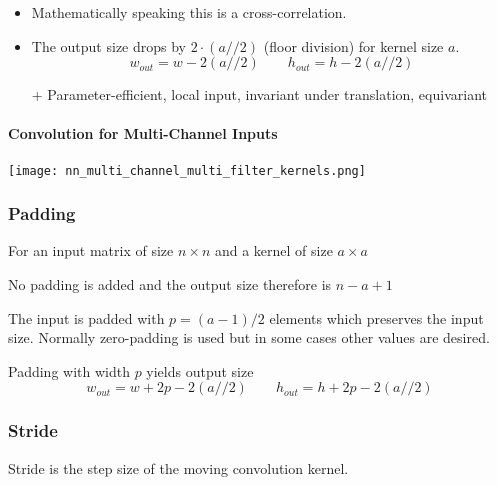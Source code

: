 \newpar{}
\begin{itemize}
    \item Mathematically speaking this is a cross-correlation.
    \item The output size drops by $2\cdot (a//2)$ (floor division) for kernel size $a$.
          \begin{equation*}
              w_{out}=  w-2(a//2) \qquad
              h_{out}=  h-2(a//2)
          \end{equation*}
    \item [+] Parameter-efficient, local input, invariant under translation, equivariant
\end{itemize}

\paragraph{Convolution for Multi-Channel Inputs}
\begin{center}
    \texttt{[image: nn\_multi\_channel\_multi\_filter\_kernels.png]}
\end{center}

\subsubsection{Padding}

For an input matrix of size $n\times n$ and a kernel of size $a\times a$

\newpar{}

No padding is added and the output size therefore is $n-a+1$

\newpar{}

The input is padded with $p=(a-1)/2$ elements which preserves the input size. Normally zero-padding is used but in some cases other values are desired.

\newpar{}

Padding with width $p$ yields output size
\begin{equation*}
    w_{out}=  w+2p-2(a//2) \qquad
    h_{out}=  h+2p-2(a//2)
\end{equation*}

\subsubsection{Stride}
Stride is the step size of the moving convolution kernel.

